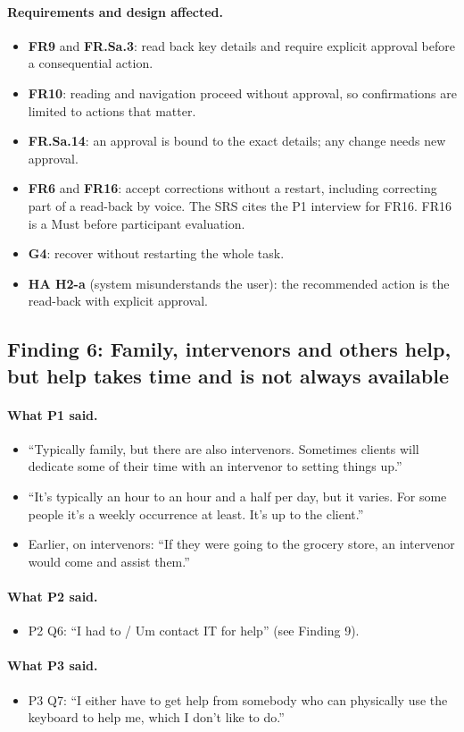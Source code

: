 \documentclass[12pt, titlepage]{article}
\newcommand{\said}{\paragraph{What P1 said.}}
\newcommand{\saidtwo}{\paragraph{What P2 said.}}
\newcommand{\saidthree}{\paragraph{What P3 said.}}
\newcommand{\affects}{\paragraph{Requirements and design affected.}}
\begin{document}
\affects
\begin{itemize}
    \item \textbf{FR9} and \textbf{FR.Sa.3}: read back key details and require explicit approval before a consequential action.
    \item \textbf{FR10}: reading and navigation proceed without approval, so confirmations are limited to actions that matter.
    \item \textbf{FR.Sa.14}: an approval is bound to the exact details; any change needs new approval.
    \item \textbf{FR6} and \textbf{FR16}: accept corrections without a restart, including correcting part of a read-back by voice. The SRS cites the P1 interview for FR16. FR16 is a Must before participant evaluation.
    \item \textbf{G4}: recover without restarting the whole task.
    \item \textbf{HA H2-a} (system misunderstands the user): the recommended action is the read-back with explicit approval.
\end{itemize}

\subsection{Finding 6: Family, intervenors and others help, but help takes time and is not always available}

\said
\begin{itemize}
    \item ``Typically family, but there are also intervenors. Sometimes clients will dedicate some of their time with an intervenor to setting things up.''
    \item ``It's typically an hour to an hour and a half per day, but it varies. For some people it's a weekly occurrence at least. It's up to the client.''
    \item Earlier, on intervenors: ``If they were going to the grocery store, an intervenor would come and assist them.''
\end{itemize}

\saidtwo
\begin{itemize}
    \item P2 Q6: ``I had to / Um contact IT for help'' (see Finding 9).
\end{itemize}

\saidthree
\begin{itemize}
    \item P3 Q7: ``I either have to get help from somebody who can physically use the keyboard to help me, which I don't like to do.''
\end{itemize}
\end{document}
